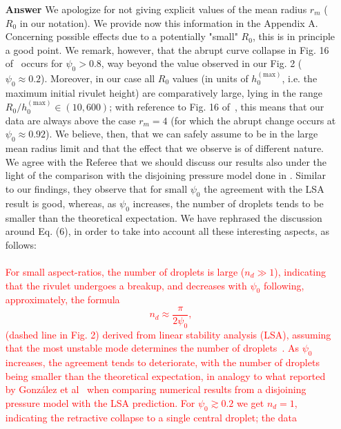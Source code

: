 \documentclass[12pt,english]{article}
\begin{document}
\begin{itemize}
\item[ \textbf{{Answer}}]
{
We apologize for not giving explicit values of the mean radius $r_m$ ($R_0$ in our notation). We provide now this information in the Appendix A.
Concerning possible effects due to a potentially "small" $R_0$, this is in principle a good point. 
We remark, however, that the abrupt curve collapse in Fig. 16 of~\cite{gonzalezStabilityLiquidRing2013}
occurs for $\psi_0 > 0.8$, way beyond the value observed in our Fig. 2 ($\psi_0 \approx 0.2$). Moreover, in our case 
all $R_0$ values (in units of $h_0^{(\text{max})}$, i.e. the maximum initial rivulet height) are comparatively large, 
 lying in the range $R_0/h_0^{(\text{max})} \in (10, 600)$; with reference to Fig. 16 of~\cite{gonzalezStabilityLiquidRing2013}, this means that our data are always above the case $r_m =4$ (for which the abrupt 
 change occurs at $\psi_0 \approx 0.92$).
 We believe, then, that we can safely assume to be in the large mean radius limit and that the effect that we observe
 is of different nature. 
 We agree with the Referee that we should discuss our results also under the light of the comparison with the disjoining 
 pressure model done in \cite{gonzalezStabilityLiquidRing2013}. Similar to our findings, they observe that for small 
 $\psi_0$ the agreement with the LSA result is good, whereas, as $\psi_0$ increases, the number of droplets tends to be 
 smaller than the theoretical expectation.
 We have rephrased the discussion around Eq. (6), in order to take into account all these interesting aspects, 
 as follows:\\
\\
\textcolor{red}{For small aspect-ratios, the number of droplets is large ($n_d \gg 1$), 
indicating that the rivulet undergoes a breakup, and decreases with $\psi_0$ following, approximately, the formula 
\begin{equation}\label{eq:maxDrops}
    n_d \approx \frac{\pi}{2\psi_0},
\end{equation}
(dashed line in Fig. 2) derived from linear stability analysis (LSA), assuming that the most unstable mode determines the number of droplets~\cite{gonzalezStabilityLiquidRing2013}.
As $\psi_0$ increases, the agreement tends to deteriorate, with the number of droplets being smaller than the theoretical expectation, in analogy to what reported by Gonz\'alez 
et al~\cite{gonzalezStabilityLiquidRing2013} when comparing numerical results from a disjoining pressure model with the LSA prediction. 
For $\psi_0 \gtrsim 0.2$ we get $n_d=1$, indicating the retractive collapse to a single central droplet; the data 
}}
\end{itemize}
\end{document}
